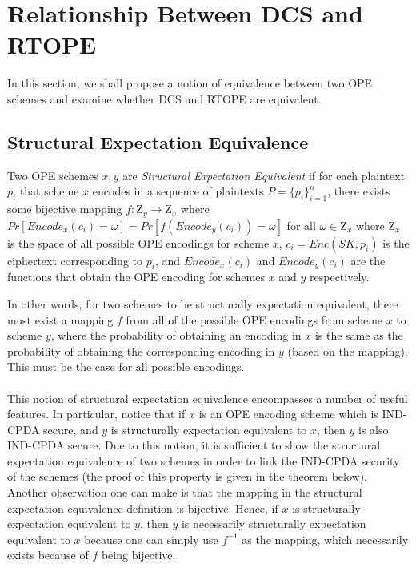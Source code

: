 \documentclass[12pt]{article}
\newenvironment{definition}[1][Definition]{\begin{trivlist}
\item[\hskip \labelsep {\bfseries #1}]}{\end{trivlist}}
\begin{document}
\section{Relationship Between DCS and RTOPE}

  In this section, we shall propose a notion of equivalence between two OPE schemes and examine whether DCS and RTOPE are equivalent.

  \subsection{Structural Expectation Equivalence} 

\begin{definition} 
  Two OPE schemes $x,y$ are \emph{Structural Expectation Equivalent} if for each plaintext $p_i$ that scheme $x$ encodes in a sequence of plaintexts $P = \{p_i\}_{i=1}^n$, there exists some bijective mapping $f: \mathrm{Z}_y \to \mathrm{Z}_x$ where $Pr[Encode_x(c_i) = \omega] = Pr[f(Encode_y(c_i)) = \omega]$ for all $\omega \in \mathrm{Z}_x$ where $\mathrm{Z}_x$ is the space of all possible OPE encodings for scheme $x$, $c_i = Enc(SK, p_i)$ is the ciphertext corresponding to $p_i$, and $Encode_x(c_i)$ and $Encode_y(c_i)$ are the functions that obtain the OPE encoding for schemes $x$ and $y$ respectively.
\end{definition}

In other words, for two schemes to be structurally expectation equivalent, there must exist a mapping $f$ from all of the possible OPE encodings from scheme $x$ to scheme $y$, where the probability of obtaining an encoding in $x$ is the same as the probability of obtaining the corresponding encoding in $y$ (based on the mapping). This must be the case for all possible encodings. \\ \\
This notion of structural expectation equivalence encompasses a number of useful features. In particular, notice that if $x$ is an OPE encoding scheme which is IND-CPDA secure, and $y$ is structurally expectation equivalent to $x$, then $y$ is also IND-CPDA secure. Due to this notion, it is sufficient to show the structural expectation equivalence of two schemes in order to link the IND-CPDA security of the schemes (the proof of this property is given in the theorem below). Another observation one can make is that the mapping in the structural expectation equivalence definition is bijective. Hence, if $x$ is structurally expectation equivalent to $y$, then $y$ is necessarily structurally expectation equivalent to $x$ because one can simply use $f^{-1}$ as the mapping, which necessarily exists because of $f$ being bijective. \\
\end{document}
